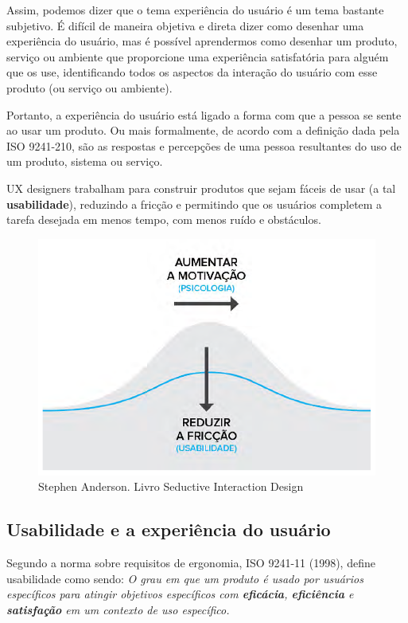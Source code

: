Assim, podemos dizer que o tema experiência do usuário é um tema bastante subjetivo. É difícil de maneira objetiva e direta dizer como desenhar uma experiência do usuário, mas é possível aprendermos como desenhar um produto, serviço ou ambiente que proporcione uma experiência satisfatória para alguém que os use, identificando todos os aspectos da interação do usuário com esse produto (ou serviço ou ambiente).

Portanto, a experiência do usuário está ligado a forma com que a pessoa se sente ao usar um produto. Ou mais formalmente, de acordo com a definição dada pela ISO 9241-210, são as respostas e percepções de uma pessoa resultantes do uso de um produto, sistema ou serviço.

UX designers trabalham para construir produtos que sejam fáceis de usar
(a tal \textbf{usabilidade}), reduzindo a fricção e permitindo que os usuários completem a tarefa desejada em menos tempo, com menos ruído e obstáculos.

\begin{figure}[H]
	\centering
	\includegraphics[scale=0.4]{imagens/aumento-friqcao.png}
	\caption{Stephen Anderson. Livro Seductive Interaction Design}
\end{figure}

\subsection{Usabilidade e a experiência do usuário}

Segundo a norma sobre requisitos de ergonomia, ISO 9241-11 (1998), define usabilidade como sendo: \textit{O grau em que um produto é usado por usuários específicos para atingir objetivos
específicos com \textbf{eficácia}, \textbf{eficiência} e \textbf{satisfação} em um contexto de uso
específico.}


